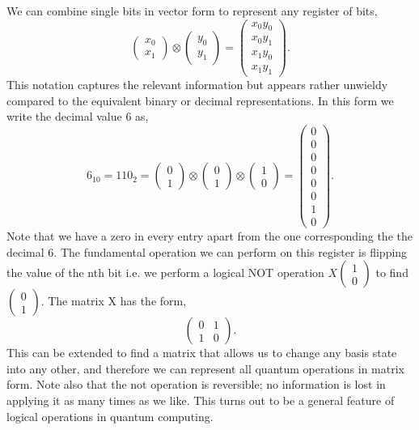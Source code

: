 We can combine single bits in vector form to represent any register of bits,
\begin{equation}
\begin{pmatrix} x_0\\ x_1 \end{pmatrix} \otimes
\begin{pmatrix} y_0\\ y_1 \end{pmatrix}
= \begin{pmatrix} x_0 y_0 \\ x_0 y_1 \\ x_1 y_0 \\ x_1 y_1 \end{pmatrix}.
\end{equation}
This notation captures the relevant information but appears rather unwieldy compared to the equivalent binary or decimal representations.
In this form we write the decimal value 6 as,
\begin{equation}
6_{10} = 110_2 =  \begin{pmatrix} 0\\ 1 \end{pmatrix} \otimes \begin{pmatrix} 0\\ 1 \end{pmatrix} \otimes \begin{pmatrix} 1\\ 0 \end{pmatrix} = \begin{pmatrix} 0 \\ 0 \\ 0 \\ 0 \\ 0 \\ 0 \\ 1 \\ 0 \end{pmatrix}.
\end{equation}
Note that we have a zero in every entry apart from the one corresponding the the decimal 6.
The fundamental operation we can perform on this register is flipping the value of the nth bit i.e. we perform a logical NOT operation $ X \begin{pmatrix} 1\\ 0 \end{pmatrix}  $ to find $ \begin{pmatrix} 0\\ 1 \end{pmatrix} $. 
The matrix X has the form,
\begin{equation}
\begin{pmatrix}
 0 & 1 \\ 1 & 0 
\end{pmatrix}.
\end{equation}
This can be extended to find a matrix that allows us to change any basis state into any other, and therefore we can represent all quantum operations in matrix form. Note also that the not operation is reversible; no information is lost in applying it as many times as we like. This turns out to be a general feature of logical operations in quantum computing.


